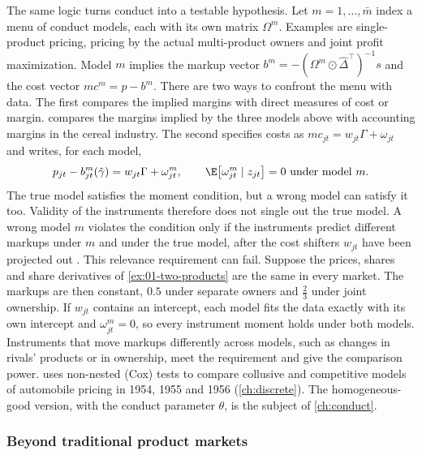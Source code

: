 The same logic turns conduct into a testable hypothesis. Let $m = 1, \dots, \bar m$ index a menu of conduct
models, each with its own matrix $\Omega^m$. Examples are single-product pricing, pricing by the actual
multi-product owners and joint profit maximization. Model $m$ implies the markup vector
$b^m = -(\Omega^m \odot \hat\Delta^\top)^{-1}s$ and the cost vector $mc^m = p - b^m$. There are two ways
to confront the menu with data. The first compares the implied margins with direct measures of cost or margin.
\citet{Nevo2001} compares the margins implied by the three models above with accounting margins in the cereal
industry. The second specifies costs as $mc_{jt} = w_{jt}\Gamma + \omega_{jt}$ and writes, for each model,
\begin{equation}\label{eq:01-conduct-test}
  p_{jt} - b^m_{jt}(\hat\gamma) = w_{jt}\Gamma + \omega^m_{jt}, \qquad \E\big[\omega^m_{jt} \mid z_{jt}\big] = 0
  \text{ under model } m .
\end{equation}
The true model satisfies the moment condition, but a wrong model can satisfy it too. Validity of the
instruments therefore does not single out the true model. A wrong model $m$ violates the condition only if
the instruments predict different markups under $m$ and under the true model, after the cost shifters
$w_{jt}$ have been projected out \citep[Lemma~1, p.~577]{DuarteEtAl2024}. This relevance requirement can
fail. Suppose the prices, shares and share derivatives of \cref{ex:01-two-products} are the same in every
market. The markups are then constant, $0.5$ under separate owners and $\frac{2}{3}$ under joint ownership.
If $w_{jt}$ contains an intercept, each model fits the data exactly with its own intercept and
$\omega^m_{jt} = 0$, so every instrument moment holds under both models. Instruments that move markups
differently across models, such as changes in rivals' products or in ownership, meet the requirement and
give the comparison power. \citet{Bresnahan1987}
uses non-nested (Cox) tests to compare collusive and competitive models of automobile pricing in 1954, 1955
and 1956 (\cref{ch:discrete}). The homogeneous-good version, with the conduct parameter $\theta$, is the
subject of \cref{ch:conduct}.

\subsubsection{Beyond traditional product markets}


